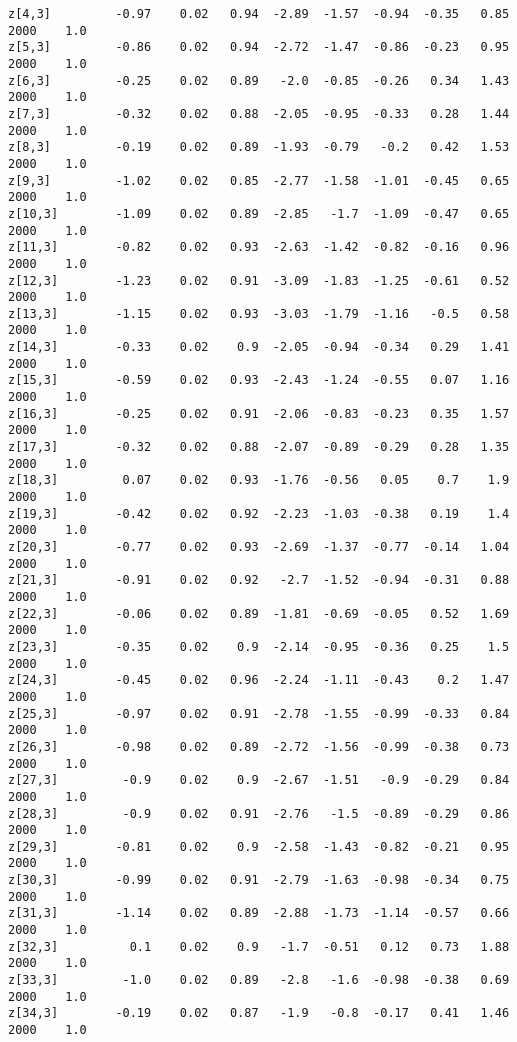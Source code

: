 \documentclass[11pt]{article}
\begin{document}
\begin{Verbatim}[commandchars=\\\{\}]
z[4,3]         -0.97    0.02   0.94  -2.89  -1.57  -0.94  -0.35   0.85   2000    1.0
z[5,3]         -0.86    0.02   0.94  -2.72  -1.47  -0.86  -0.23   0.95   2000    1.0
z[6,3]         -0.25    0.02   0.89   -2.0  -0.85  -0.26   0.34   1.43   2000    1.0
z[7,3]         -0.32    0.02   0.88  -2.05  -0.95  -0.33   0.28   1.44   2000    1.0
z[8,3]         -0.19    0.02   0.89  -1.93  -0.79   -0.2   0.42   1.53   2000    1.0
z[9,3]         -1.02    0.02   0.85  -2.77  -1.58  -1.01  -0.45   0.65   2000    1.0
z[10,3]        -1.09    0.02   0.89  -2.85   -1.7  -1.09  -0.47   0.65   2000    1.0
z[11,3]        -0.82    0.02   0.93  -2.63  -1.42  -0.82  -0.16   0.96   2000    1.0
z[12,3]        -1.23    0.02   0.91  -3.09  -1.83  -1.25  -0.61   0.52   2000    1.0
z[13,3]        -1.15    0.02   0.93  -3.03  -1.79  -1.16   -0.5   0.58   2000    1.0
z[14,3]        -0.33    0.02    0.9  -2.05  -0.94  -0.34   0.29   1.41   2000    1.0
z[15,3]        -0.59    0.02   0.93  -2.43  -1.24  -0.55   0.07   1.16   2000    1.0
z[16,3]        -0.25    0.02   0.91  -2.06  -0.83  -0.23   0.35   1.57   2000    1.0
z[17,3]        -0.32    0.02   0.88  -2.07  -0.89  -0.29   0.28   1.35   2000    1.0
z[18,3]         0.07    0.02   0.93  -1.76  -0.56   0.05    0.7    1.9   2000    1.0
z[19,3]        -0.42    0.02   0.92  -2.23  -1.03  -0.38   0.19    1.4   2000    1.0
z[20,3]        -0.77    0.02   0.93  -2.69  -1.37  -0.77  -0.14   1.04   2000    1.0
z[21,3]        -0.91    0.02   0.92   -2.7  -1.52  -0.94  -0.31   0.88   2000    1.0
z[22,3]        -0.06    0.02   0.89  -1.81  -0.69  -0.05   0.52   1.69   2000    1.0
z[23,3]        -0.35    0.02    0.9  -2.14  -0.95  -0.36   0.25    1.5   2000    1.0
z[24,3]        -0.45    0.02   0.96  -2.24  -1.11  -0.43    0.2   1.47   2000    1.0
z[25,3]        -0.97    0.02   0.91  -2.78  -1.55  -0.99  -0.33   0.84   2000    1.0
z[26,3]        -0.98    0.02   0.89  -2.72  -1.56  -0.99  -0.38   0.73   2000    1.0
z[27,3]         -0.9    0.02    0.9  -2.67  -1.51   -0.9  -0.29   0.84   2000    1.0
z[28,3]         -0.9    0.02   0.91  -2.76   -1.5  -0.89  -0.29   0.86   2000    1.0
z[29,3]        -0.81    0.02    0.9  -2.58  -1.43  -0.82  -0.21   0.95   2000    1.0
z[30,3]        -0.99    0.02   0.91  -2.79  -1.63  -0.98  -0.34   0.75   2000    1.0
z[31,3]        -1.14    0.02   0.89  -2.88  -1.73  -1.14  -0.57   0.66   2000    1.0
z[32,3]          0.1    0.02    0.9   -1.7  -0.51   0.12   0.73   1.88   2000    1.0
z[33,3]         -1.0    0.02   0.89   -2.8   -1.6  -0.98  -0.38   0.69   2000    1.0
z[34,3]        -0.19    0.02   0.87   -1.9   -0.8  -0.17   0.41   1.46   2000    1.0

\end{Verbatim}
\end{document}

